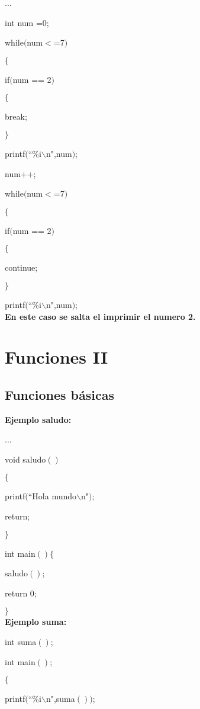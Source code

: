 \documentclass[]{article}
\begin{document}
	...
	
	int num =0;	
	
	while$($num$<$=7$)$
	
	$\lbrace$
	
	if$($num == 2$)$
	
	$\lbrace$
	
	break;
	
	$\rbrace$
	
	printf$($``\%i$\backslash$n",num$)$;
	
	num++;
	
	while$($num$<$=7$)$
	
	$\lbrace$
	
	if$($num == 2$)$
	
	$\lbrace$
	
	continue;
	
	$\rbrace$
	
	printf$($``\%i$\backslash$n",num$)$;\\
	
	\textbf{En este caso se salta el imprimir el numero 2.}
	
	
	\section{Funciones II}
	
	\subsection{Funciones básicas}
	
	
	\textbf{Ejemplo saludo:\\}
	
	...
	
	void saludo$()$
	
	$\lbrace$
	
	printf$($``Hola mundo$\backslash$n"$)$;
	
	return;
	
	$\rbrace$
	
	int main$()$$\lbrace$
	
	saludo$()$;
	
	return 0;
	
	$\rbrace$\\
	
	\textbf{Ejemplo suma:}
	
	int suma$()$;
	
	int main$()$;
	
	$\lbrace$
	
	printf$($``\%i$\backslash$n",suma$())$;
	
\end{document}
